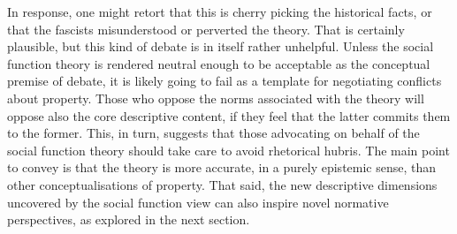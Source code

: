 {{In response, one might retort that this is cherry picking the historical facts, or that the fascists misunderstood or perverted the theory. That is certainly plausible, but this kind of debate is in itself rather unhelpful. Unless the social function theory is rendered neutral enough to be acceptable as the conceptual premise of debate, it is likely going to fail as a template for negotiating conflicts about property. Those who oppose the norms associated with the theory will oppose also the core descriptive content, if they feel that the latter commits them to the former. This, in turn, suggests that those advocating on behalf of the social function theory should take care to avoid rhetorical hubris. The main point to convey is that the theory is more accurate, in a purely epistemic sense, than other conceptualisations of property. }
}
That said, the new descriptive dimensions uncovered by the social function view can also inspire novel normative perspectives, as explored in the next section.


